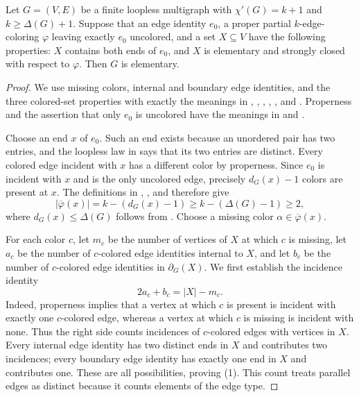 \begin{lemma}
Let $G=(V,E)$ be a finite loopless multigraph with
$\chi'(G)=k+1$ and $k\geq\Delta(G)+1$.  Suppose that an edge identity
$e_0$, a proper partial $k$-edge-coloring $\varphi$ leaving exactly $e_0$
uncolored, and a set $X\subseteq V$ have the following properties: $X$
contains both ends of $e_0$, and $X$ is elementary and strongly closed with
respect to $\varphi$.  Then $G$ is elementary.
\end{lemma}
\begin{proof}
We use missing colors, internal and boundary edge identities, and the three
colored-set properties with exactly the meanings in
, , ,
, , and
.  Properness and the assertion that
only $e_0$ is uncolored have the meanings in
 and .

Choose an end $x$ of $e_0$.  Such an end exists because an unordered pair
has two entries, and the loopless law in  says
that its two entries are distinct.  Every colored edge incident with $x$
has a different color by properness.  Since $e_0$ is incident with $x$ and
is the only uncolored edge, precisely $d_G(x)-1$ colors are present at $x$.
The definitions in , , and
 therefore give
\[
 |\overline\varphi(x)|=k-(d_G(x)-1)
 \geq k-(\Delta(G)-1)\geq2,
\]
where $d_G(x)\leq\Delta(G)$ follows from .  Choose a
missing color $\alpha\in\overline\varphi(x)$.

For each color $c$, let $m_c$ be the number of vertices of $X$ at which
$c$ is missing, let $a_c$ be the number of $c$-colored edge identities
internal to $X$, and let $b_c$ be the number of $c$-colored edge identities
in $\partial_G(X)$.  We first establish the incidence identity
\[
                 2a_c+b_c=|X|-m_c.                 \tag{1}
\]
Indeed, properness implies that a vertex at which $c$ is present is
incident with exactly one $c$-colored edge, whereas a vertex at which $c$
is missing is incident with none.  Thus the right side counts incidences of
$c$-colored edges with vertices in $X$.  Every internal edge identity has
two distinct ends in $X$ and contributes two incidences; every boundary
edge identity has exactly one end in $X$ and contributes one.  These are all
possibilities, proving (1).  This count treats parallel edges as distinct
because it counts elements of the edge type.


\end{proof}
